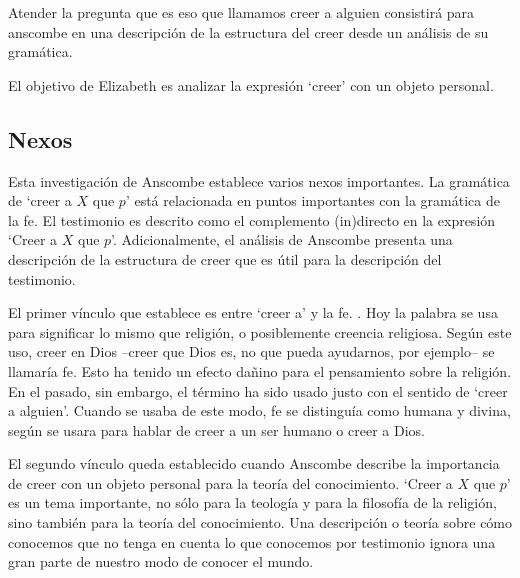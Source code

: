  Atender la pregunta que es eso que llamamos creer a alguien
consistirá para anscombe en una descripción de la estructura del creer
desde un análisis de su gramática.

El objetivo de Elizabeth es analizar la expresión `creer' con un objeto
personal.



\subsection{Nexos}
Esta investigación de Anscombe establece varios nexos importantes. La gramática
de `creer a $X$ que $p$' está relacionada en puntos importantes con la gramática
de la fe. El testimonio es descrito como el complemento (in)directo en la
expresión `Creer a $X$ que $p$'. Adicionalmente, el análisis de Anscombe
presenta una descripción de la estructura de creer que es útil para la
descripción del testimonio.

El primer vínculo que establece es entre `creer a' y la fe. . Hoy la palabra se usa para significar lo mismo que religión, o
posiblemente creencia religiosa. Según este uso, creer en Dios --creer que Dios
es, no que pueda ayudarnos, por ejemplo-- se llamaría fe. Esto ha tenido un
efecto dañino para el pensamiento sobre la religión. En el pasado, sin embargo,
el término ha sido usado justo con el sentido de `creer a alguien'. Cuando se
usaba de este modo, fe se distinguía como humana y divina, según se usara para
hablar de creer a un ser humano o creer a Dios.

El segundo vínculo queda establecido cuando Anscombe describe la importancia de
creer con un objeto personal para la teoría del conocimiento. `Creer a $X$ que
$p$' es un tema importante, no sólo para la teología y para la filosofía de la
religión, sino también para la teoría del conocimiento. Una descripción o teoría
sobre cómo conocemos que no tenga en cuenta lo que conocemos por testimonio
ignora una gran parte de nuestro modo de conocer el mundo. 

